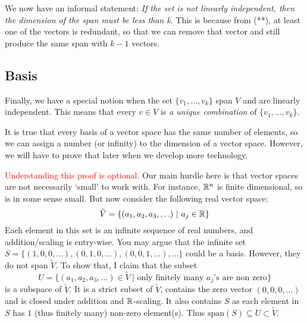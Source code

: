 We now have an informal statement: \textit{If the set is not linearly independent, then the dimension of the span must be less than k}.
This is because from (**), at least one of the vectors is redundant, so that we can remove that vector and still produce the same span with $k-1$ vectors.
\subsection{Basis}

Finally, we have a special notion when the set $\{{v}_1,\ldots,v_k\}$ span $V$ and are linearly independent. This means that every $v\in V$ is
\textit{a unique combination} of $\{{v}_1,\ldots,v_k\}$.
\begin{remark}
	It is true that every basis of a vector space has the same number of elements, so we can assign a number (or infinity) to the dimension of a vector space. However, we will have to prove that later when we develop more technology.
\end{remark}
\textcolor{red}{Understanding this proof is optional.} Our main hurdle here is that vector spaces are not necessarily `small' to work with.
For instance, $\mathbb{R}^n$ is finite dimensional, so is in some sense small. But now consider the following real vector space:\[
	\tilde{V}=\{(a_1,a_2,a_3,\ldots) \ | \ a_j\in\reals \}
\]
Each element in this set is an infinite sequence of real numbers, and addition/scaling is entry-wise.
You may argue that the infinite set $S=\{(1,0,0,\ldots), (0,1,0,\ldots),(0,0,1,\ldots),\ldots\}$ could be a basis. However,
they do not span $\tilde{V}$. To show that, I claim that the subset \[
U = \{(a_1,a_2,a_3,\ldots)\in\tilde{V} \ | \textrm{ only finitely many $a_j$'s are non zero}\}
\]
is a subspace of $\tilde{V}$. It is a strict subset of $\tilde{V}$, contains the zero vector $(0,0,0,\ldots)$ and is closed
under addition and $\mathbb{R}$-scaling.
It also contains $S$ as each element in $S$ has $1$ (thus finitely many) non-zero element(s).
Thus $\textrm{span}(S)\subseteq U \subset \tilde{V}$.

